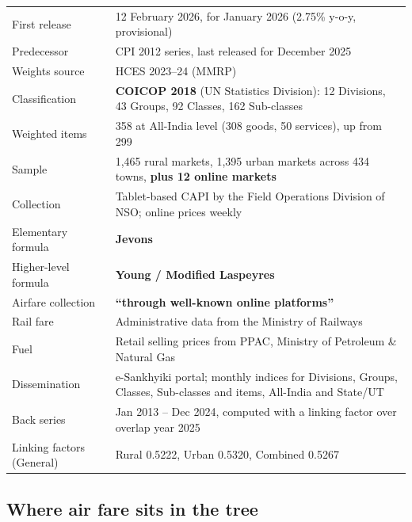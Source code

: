 \begin{center}
\small
\begin{tabularx}{\textwidth}{@{}L{6.2cm} X@{}}
\toprule
{} &  \\
\midrule
First release & 12 February 2026, for January 2026 (2.75\% y-o-y, provisional) \\
Predecessor & CPI 2012 series, last released for December 2025 \\
Weights source & HCES 2023--24 (MMRP) \\
Classification & \textbf{COICOP 2018} (UN Statistics Division): 12 Divisions, 43 Groups, 92 Classes, 162 Sub-classes \\
Weighted items & 358 at All-India level (308 goods, 50 services), up from 299 \\
Sample & 1{,}465 rural markets, 1{,}395 urban markets across 434 towns, \textbf{plus 12 online markets} \\
Collection & Tablet-based CAPI by the Field Operations Division of NSO; online prices weekly \\
Elementary formula & \textbf{Jevons} \\
Higher-level formula & \textbf{Young / Modified Laspeyres} \\
Airfare collection & \textbf{``through well-known online platforms''} \\
Rail fare & Administrative data from the Ministry of Railways \\
Fuel & Retail selling prices from PPAC, Ministry of Petroleum \& Natural Gas \\
Dissemination & e-Sankhyiki portal; monthly indices for Divisions, Groups, Classes, Sub-classes and items, All-India and State/UT \\
Back series & Jan 2013 -- Dec 2024, computed with a linking factor over overlap year 2025 \\
Linking factors (General) & Rural 0.5222, Urban 0.5320, Combined 0.5267 \\
\bottomrule
\end{tabularx}
\end{center}

\subsection{Where air fare sits in the tree}


